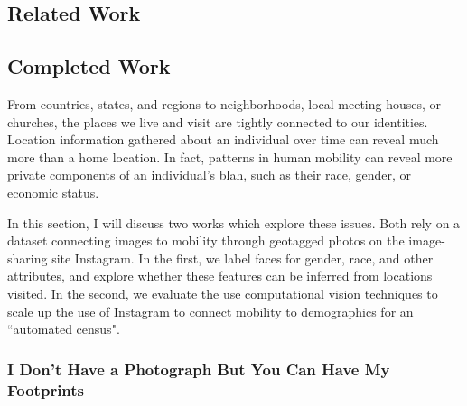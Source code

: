 
\subsection{Related Work}


\subsection{Completed Work}
From countries, states, and regions to neighborhoods, local meeting houses, or churches, the places we live and visit are tightly connected to our identities.
Location information gathered about an individual over time can reveal much more than a home location.
In fact, patterns in human mobility can reveal more private components of an individual's 
blah, such as their race, gender, or economic status.

In this section, I will discuss two works which explore these issues.
Both rely on a dataset connecting images to mobility through geotagged photos on the image-sharing site Instagram.
In the first, we label faces for gender, race, and other attributes, and explore whether these features can be inferred from locations visited.
In the second, we evaluate the use computational vision techniques to scale up the use of Instagram to connect mobility to demographics for an ``automated census".


\subsubsection{I Don’t Have a Photograph But You Can Have My Footprints}









